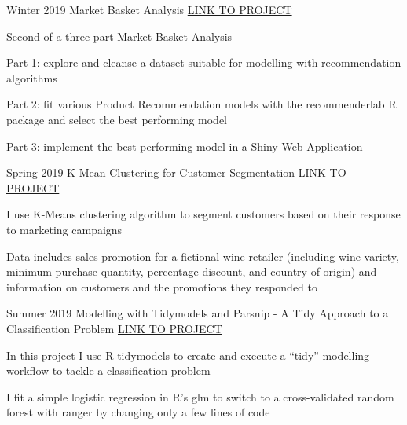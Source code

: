 

\begin{cventries}

  \cventry
    {Winter 2019} %
    {Market Basket Analysis} %
    {\href{https://diegousai.io/2019/03/market-basket-analysis-part-2-of-3}{LINK TO PROJECT}} %
    {} %
    {
      \begin{cvitems} %
        \item {Second of a three part Market Basket Analysis}
        \item {Part 1: explore and cleanse a dataset suitable for modelling with recommendation algorithms}
        \item {Part 2: fit various Product Recommendation models with the recommenderlab R package and select the best performing model}
        \item {Part 3: implement the best performing model in a Shiny Web Application}
      \end{cvitems}
    }

  \cventry
    {Spring 2019} %
    {K-Mean Clustering for Customer Segmentation} %
    {\href{https://diegousai.io/2019/05/a-gentle-introduction-to-customer-segmentation}{LINK TO PROJECT}} %
    {} %
    {
      \begin{cvitems} %
        \item {I use K-Means clustering algorithm to segment customers based on their response to marketing campaigns}
        \item {Data includes sales promotion for a fictional wine retailer (including wine variety, minimum purchase quantity, percentage discount, and country of origin) and information on customers and the promotions they responded to}
      \end{cvitems}
    }
    
  \cventry
    {Summer 2019} %
    {Modelling with Tidymodels and Parsnip - A Tidy Approach to a Classification Problem} %
    {\href{https://diegousai.io/2019/09/modelling-with-tidymodels-and-parsnip}{LINK TO PROJECT}} %
    {} %
    {
      \begin{cvitems} %
        \item {In this project I use R tidymodels to create and execute a “tidy” modelling workflow to tackle a classification problem}
        \item {I fit a simple logistic regression in R’s glm to switch to a cross-validated random forest with ranger by changing only a few lines of code}
      \end{cvitems}
    }

\end{cventries}
